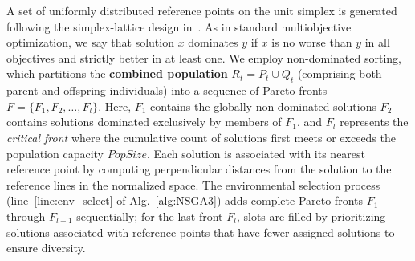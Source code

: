 \documentclass[a4paper,fleqn]{cas-sc}
\begin{document}
A set of uniformly distributed reference points on the unit simplex is generated following the simplex-lattice design in~\citet{deb2014nsga3}.
As in standard multiobjective optimization, we say that solution $x$ dominates $y$ if $x$ is no worse than $y$ in all objectives and strictly better in at least one. We employ non-dominated sorting, which partitions the \textbf{combined population} $R_t = P_t \cup Q_t$ (comprising both parent and offspring individuals) into a sequence of Pareto fronts $F = \{F_1, F_2, \dots, F_l\}$.
Here, $F_1$ contains the globally non-dominated solutions
$F_2$ contains solutions dominated exclusively by members of $F_1$, and $F_l$ represents the \textit{critical front} where the cumulative count of solutions first meets or exceeds the population capacity $\textit{PopSize}$.
%
Each solution is associated with its nearest reference point by computing perpendicular distances from the solution to the reference lines in the normalized space. 
The environmental selection process (line~\ref{line:env_select} of Alg.~\ref{alg:NSGA3}) adds complete Pareto fronts $F_1$ through $F_{l-1}$ sequentially; for the last front $F_l$, slots are filled by prioritizing solutions associated with reference points that have fewer assigned solutions to ensure diversity.
\end{document}
